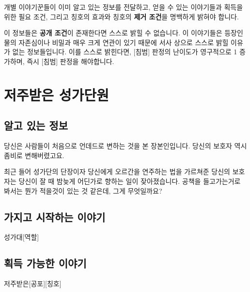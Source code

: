 \documentclass{report}
\begin{document}
	개별 이야기꾼들이 이미 알고 있는 정보를 전달하고, 얻을 수 있는 이야기들과 획득을 위한 필요 조건, 그리고 칭호의 효과와 칭호의 \textbf{제거 조건}을 명백하게 밝혀야 합니다.
	
	이 정보들은 \textbf{공개 조건}이 존재한다면 스스로 밝힐 수 없습니다. 이 이야기들은 등장인물의 자존심이나 비밀과 매우 크게 연관이 있기 때문에 서사 상으로 스스로 밝힐 이유가 없는 정보들입니다. 이를 스스로 밝힌다면, [침범] 판정의 난이도가 영구적으로 1 증가하며, 즉시 [침범] 판정을 해야합니다.
	
	
	
	
	
	\pagebreak
	\section{저주받은 성가단원}
		\subsection*{알고 있는 정보}
			당신은 사람들이 처음으로 언데드로 변하는 것을 본 장본인입니다. 당신의 보호자 역시 좀비로 변해버렸고요.
			
			최근 들어 성가단의 단장이자 당신에게 오르간을 연주하는 법을 가르쳐준 당신의 보호자는 당신이 잘 때 밤늦게 어딘가로 향하는 일이 잦아졌습니다. 공책을 들고가는거로 봐서는 뭔가 적을것이 있는 것 같은데, 그게 무엇일까요?
			
		\subsection*{가지고 시작하는 이야기}
			\begin{spoiler}{성가대}{[역할]}
				
				
			\end{spoiler}
		
		\subsection*{획득 가능한 이야기}
			\begin{spoiler}{저주받은}{[공포][칭호]}
				
				
			\end{spoiler}
			
\end{document}
